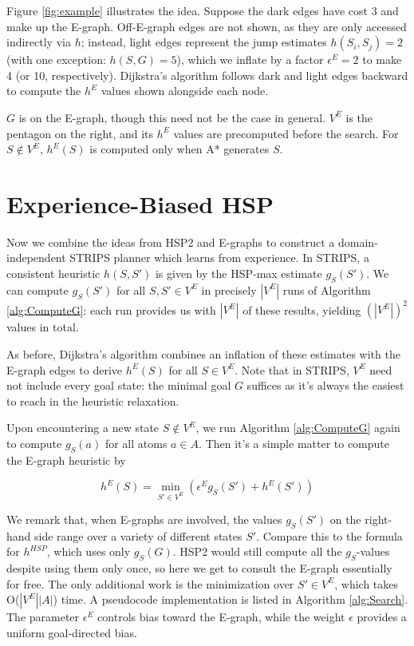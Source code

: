 \documentclass[letterpaper]{article}
\begin{document}
Figure \ref{fig:example} illustrates the idea. Suppose the dark edges have cost 3 and make up the E-graph. Off-E-graph edges are not shown, as they are only accessed indirectly via $h$; instead, light edges represent the jump estimates $h(S_i,S_j) = 2$ (with one exception: $h(S,G) = 5$), which we inflate by a factor $\epsilon^E=2$ to make 4 (or 10, respectively). Dijkstra's algorithm follows dark and light edges backward to compute the $h^E$ values shown alongside each node.

$G$ is on the E-graph, though this need not be the case in general. $V^E$ is the pentagon on the right, and its $h^E$ values are precomputed before the search. For $S\notin V^E$, $h^E(S)$ is computed only when A* generates $S$.

\section{Experience-Biased HSP}

Now we combine the ideas from HSP2 and E-graphs to construct a domain-independent STRIPS planner which learns from experience. In STRIPS, a consistent heuristic $h(S,S')$ is given by the HSP-max estimate $g_S(S')$. We can compute $g_S(S')$ for all $S,S'\in V^E$ in precisely $|V^E|$ runs of Algorithm \ref{alg:ComputeG}: each run provides us with $|V^E|$ of these results, yielding $(|V^E|)^2$ values in total.

As before, Dijkstra's algorithm combines an inflation of these estimates with the E-graph edges to derive $h^E(S)$ for all $S\in V^E$. Note that in STRIPS, $V^E$ need not include every goal state: the minimal goal $G$ suffices as it's always the easiest to reach in the heuristic relaxation.

Upon encountering a new state $S\notin V^E$, we run Algorithm \ref{alg:ComputeG} again to compute $g_S(a)$ for all atoms $a\in A$. Then it's a simple matter to compute the E-graph heuristic by

\[h^E(S) = \min_{S'\in V^E} \left( \epsilon^E g_S(S') + h^E(S') \right)\]

We remark that, when E-graphs are involved, the values $g_S(S')$ on the right-hand side range over a variety of different states $S'$. Compare this to the formula for $h^{HSP}$, which uses only $g_S(G)$. HSP2 would still compute all the $g_S$-values despite using them only once, so here we get to consult the E-graph essentially for free. The only additional work is the minimization over $S'\in V^E$, which takes O($|V^E||A|$) time. A pseudocode implementation is listed in Algorithm \ref{alg:Search}. The parameter $\epsilon^E$ controls bias toward the E-graph, while the weight $\epsilon$ provides a uniform goal-directed bias.
\end{document}
